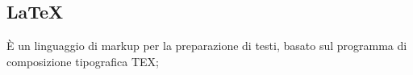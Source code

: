 \section{}
\subsection*{\LaTeX} È un linguaggio di markup per la preparazione di testi, basato sul programma di composizione tipografica TEX;